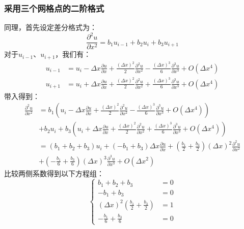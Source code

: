 \documentclass[UTF8]{ctexart}
\begin{document}
\subsubsection{采用三个网格点的二阶格式}
同理，首先设定差分格式为：
\begin{equation}
    \frac{\partial^2 u}{\partial x^2} = b_1 u_{i-1} + b_2 u_i + b_3 u_{i+1}
\end{equation}
对于$u_{i-1}$、$u_{i+1}$，我们有：
\begin{equation}
    \begin{aligned}
        u_{i-1} &= u_i - \Delta x \frac{\partial u}{\partial x} + \frac{(\Delta x)^2}{2} \frac{\partial^2 u}{\partial x^2} - \frac{(\Delta x)^3}{6} \frac{\partial^3 u}{\partial x^3} + O(\Delta x^4) \\
        u_{i+1} &= u_i + \Delta x \frac{\partial u}{\partial x} + \frac{(\Delta x)^2}{2} \frac{\partial^2 u}{\partial x^2} + \frac{(\Delta x)^3}{6} \frac{\partial^3 u}{\partial x^3} + O(\Delta x^4)
    \end{aligned}
\end{equation}
带入得到：
\begin{equation}
    \begin{aligned}
        \frac{\partial^2 u}{\partial x^2} &= b_1 \left( u_i - \Delta x \frac{\partial u}{\partial x} + \frac{(\Delta x)^2}{2} \frac{\partial^2 u}{\partial x^2} - \frac{(\Delta x)^3}{6} \frac{\partial^3 u}{\partial x^3} + O(\Delta x^4) \right) \\
        &+ b_2 u_i + b_3 \left( u_i + \Delta x \frac{\partial u}{\partial x} + \frac{(\Delta x)^2}{2} \frac{\partial^2 u}{\partial x^2} + \frac{(\Delta x)^3}{6} \frac{\partial^3 u}{\partial x^3} + O(\Delta x^4) \right)\\
        &= (b_1 + b_2 + b_3) u_i + (-b_1 + b_3) \Delta x \frac{\partial u}{\partial x} + (\frac{b_1}{2} + \frac{b_3}{2}) (\Delta x)^2 \frac{\partial^2 u}{\partial x^2} \\
        &+ (-\frac{b_1}{6} + \frac{b_3}{6}) (\Delta x)^3 \frac{\partial^3 u}{\partial x^3} + O(\Delta x^2)
    \end{aligned}
\end{equation}
比较两侧系数得到以下方程组：
\begin{equation}
    \begin{cases}
        b_1 + b_2 + b_3 &= 0 \\
        -b_1 + b_3 &= 0 \\
        (\Delta x)^2 (\frac{b_1}{2} + \frac{b_3}{2}) &= 1 \\
        -\frac{b_1}{6} + \frac{b_3}{6} &= 0
    \end{cases}
\end{equation}
\end{document}
